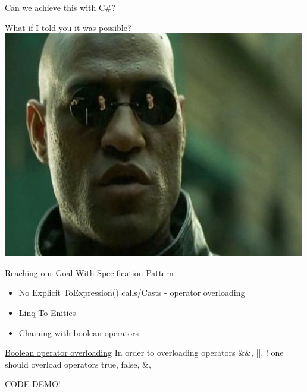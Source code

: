 \documentclass{bredelebeamer}
\newcommand{\imagefolder}{../EF.Experiments/EF.Experiments.Data/Specifications/Specification.cs}
\begin{document}
\begin{frame}{Can we achieve this with C\#?}
    \pause
    \begin{center}
        \huge What if I told you it was possible?
        \includegraphics[scale=0.45]{images/whatifitoldyou.jpg}
    \end{center}
\end{frame}

\begin{frame}[fragile]{Reaching our Goal With Specification Pattern}
    \begin{itemize}[<+->]
        \item {
            No Explicit ToExpression() calls/Casts - operator overloading
        }
        \item {
            Linq To Enities
        }
        \item {
            Chaining with boolean operators
        }
    \end{itemize}
     {
        
    }
     {
        
        
    }
     {
        \begin{block}{\href{https://docs.microsoft.com/en-us/dotnet/csharp/language-reference/language-specification/expressions\#boolean-expressions}{Boolean operator overloading}}
            In order to overloading operators \&\&, ||, ! one should overload operators true, false, \&, |
        \end{block}
        CODE DEMO!
    }
\end{frame}
\end{document}
